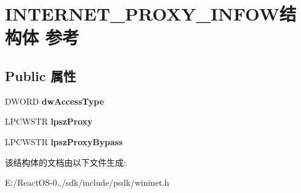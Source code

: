 \hypertarget{struct_i_n_t_e_r_n_e_t___p_r_o_x_y___i_n_f_o_w}{}\section{I\+N\+T\+E\+R\+N\+E\+T\+\_\+\+P\+R\+O\+X\+Y\+\_\+\+I\+N\+F\+O\+W结构体 参考}
\label{struct_i_n_t_e_r_n_e_t___p_r_o_x_y___i_n_f_o_w}
\subsection*{Public 属性}
\begin{DoxyCompactItemize}
\item 
\mbox{\label{struct_i_n_t_e_r_n_e_t___p_r_o_x_y___i_n_f_o_w_a3a1f523a328c1efedbdb598fb871f432}} 
D\+W\+O\+RD {\bfseries dw\+Access\+Type}
\item 
\mbox{\label{struct_i_n_t_e_r_n_e_t___p_r_o_x_y___i_n_f_o_w_ae53678ef4962aae8608676471d59b98b}} 
L\+P\+C\+W\+S\+TR {\bfseries lpsz\+Proxy}
\item 
\mbox{\label{struct_i_n_t_e_r_n_e_t___p_r_o_x_y___i_n_f_o_w_a9d1d29cf84099a04dc0781b47e4739ab}} 
L\+P\+C\+W\+S\+TR {\bfseries lpsz\+Proxy\+Bypass}
\end{DoxyCompactItemize}


该结构体的文档由以下文件生成\+:\begin{DoxyCompactItemize}
\item 
E\+:/\+React\+O\+S-\/0../sdk/include/psdk/wininet.\+h\end{DoxyCompactItemize}
